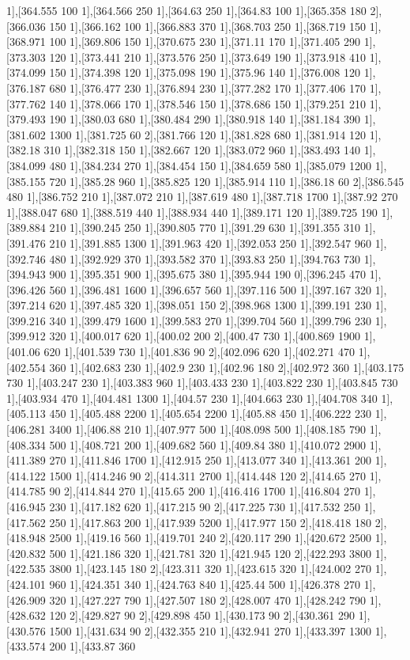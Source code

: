 {1],[364.555 100 1],[364.566 250 1],[364.63 250 1],[364.83 100 1],[365.358 180 2],[366.036 150 1],[366.162 100 1],[366.883 370 1],[368.703 250 1],[368.719 150 1],[368.971 100 1],[369.806 150 1],[370.675 230 1],[371.11 170 1],[371.405 290 1],[373.303 120 1],[373.441 210 1],[373.576 250 1],[373.649 190 1],[373.918 410 1],[374.099 150 1],[374.398 120 1],[375.098 190 1],[375.96 140 1],[376.008 120 1],[376.187 680 1],[376.477 230 1],[376.894 230 1],[377.282 170 1],[377.406 170 1],[377.762 140 1],[378.066 170 1],[378.546 150 1],[378.686 150 1],[379.251 210 1],[379.493 190 1],[380.03 680 1],[380.484 290 1],[380.918 140 1],[381.184 390 1],[381.602 1300 1],[381.725 60 2],[381.766 120 1],[381.828 680 1],[381.914 120 1],[382.18 310 1],[382.318 150 1],[382.667 120 1],[383.072 960 1],[383.493 140 1],[384.099 480 1],[384.234 270 1],[384.454 150 1],[384.659 580 1],[385.079 1200 1],[385.155 720 1],[385.28 960 1],[385.825 120 1],[385.914 110 1],[386.18 60 2],[386.545 480 1],[386.752 210 1],[387.072 210 1],[387.619 480 1],[387.718 1700 1],[387.92 270 1],[388.047 680 1],[388.519 440 1],[388.934 440 1],[389.171 120 1],[389.725 190 1],[389.884 210 1],[390.245 250 1],[390.805 770 1],[391.29 630 1],[391.355 310 1],[391.476 210 1],[391.885 1300 1],[391.963 420 1],[392.053 250 1],[392.547 960 1],[392.746 480 1],[392.929 370 1],[393.582 370 1],[393.83 250 1],[394.763 730 1],[394.943 900 1],[395.351 900 1],[395.675 380 1],[395.944 190 0],[396.245 470 1],[396.426 560 1],[396.481 1600 1],[396.657 560 1],[397.116 500 1],[397.167 320 1],[397.214 620 1],[397.485 320 1],[398.051 150 2],[398.968 1300 1],[399.191 230 1],[399.216 340 1],[399.479 1600 1],[399.583 270 1],[399.704 560 1],[399.796 230 1],[399.912 320 1],[400.017 620 1],[400.02 200 2],[400.47 730 1],[400.869 1900 1],[401.06 620 1],[401.539 730 1],[401.836 90 2],[402.096 620 1],[402.271 470 1],[402.554 360 1],[402.683 230 1],[402.9 230 1],[402.96 180 2],[402.972 360 1],[403.175 730 1],[403.247 230 1],[403.383 960 1],[403.433 230 1],[403.822 230 1],[403.845 730 1],[403.934 470 1],[404.481 1300 1],[404.57 230 1],[404.663 230 1],[404.708 340 1],[405.113 450 1],[405.488 2200 1],[405.654 2200 1],[405.88 450 1],[406.222 230 1],[406.281 3400 1],[406.88 210 1],[407.977 500 1],[408.098 500 1],[408.185 790 1],[408.334 500 1],[408.721 200 1],[409.682 560 1],[409.84 380 1],[410.072 2900 1],[411.389 270 1],[411.846 1700 1],[412.915 250 1],[413.077 340 1],[413.361 200 1],[414.122 1500 1],[414.246 90 2],[414.311 2700 1],[414.448 120 2],[414.65 270 1],[414.785 90 2],[414.844 270 1],[415.65 200 1],[416.416 1700 1],[416.804 270 1],[416.945 230 1],[417.182 620 1],[417.215 90 2],[417.225 730 1],[417.532 250 1],[417.562 250 1],[417.863 200 1],[417.939 5200 1],[417.977 150 2],[418.418 180 2],[418.948 2500 1],[419.16 560 1],[419.701 240 2],[420.117 290 1],[420.672 2500 1],[420.832 500 1],[421.186 320 1],[421.781 320 1],[421.945 120 2],[422.293 3800 1],[422.535 3800 1],[423.145 180 2],[423.311 320 1],[423.615 320 1],[424.002 270 1],[424.101 960 1],[424.351 340 1],[424.763 840 1],[425.44 500 1],[426.378 270 1],[426.909 320 1],[427.227 790 1],[427.507 180 2],[428.007 470 1],[428.242 790 1],[428.632 120 2],[429.827 90 2],[429.898 450 1],[430.173 90 2],[430.361 290 1],[430.576 1500 1],[431.634 90 2],[432.355 210 1],[432.941 270 1],[433.397 1300 1],[433.574 200 1],[433.87 360 }
